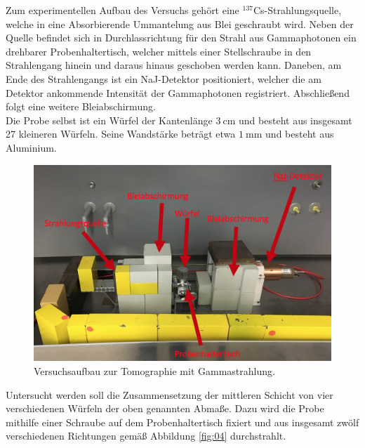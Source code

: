 \noindent Zum experimentellen Aufbau des Versuchs gehört eine
$^{137}$Cs-Strahlungsquelle, welche in eine Absorbierende Ummantelung aus Blei
geschraubt wird. Neben der Quelle befindet sich in Durchlassrichtung für den
Strahl aus Gammaphotonen ein drehbarer Probenhaltertisch, welcher mittels einer
Stellschraube in den Strahlengang hinein und daraus hinaus geschoben werden
kann. Daneben, am Ende des Strahlengangs ist ein NaJ-Detektor positioniert,
welcher die am Detektor ankommende Intensität der Gammaphotonen registriert.
Abschließend folgt eine weitere Bleiabschirmung. \\
\noindent Die Probe selbst ist ein Würfel der Kantenlänge $\SI{3}{\centi\meter}$
und besteht aus insgesamt 27 kleineren Würfeln. Seine Wandstärke beträgt etwa
$\SI{1}{\milli\meter}$ und besteht aus Aluminium. \\
\FloatBarrier
\begin{figure}
  \centering
  \includegraphics[scale=0.5]{ressources/aufbau.png}
  \caption{Versuchsaufbau zur Tomographie mit Gammastrahlung.}
  \label{fig:03}
\end{figure}
\FloatBarrier
\noindent Untersucht werden soll die Zusammensetzung der mittleren Schicht von
vier verschiedenen Würfeln der oben genannten Abmaße. Dazu wird die Probe
mithilfe einer Schraube auf dem Probenhaltertisch fixiert und aus insgesamt
zwölf verschiedenen Richtungen gemäß Abbildung \ref{fig:04} durchstrahlt.
\FloatBarrier
